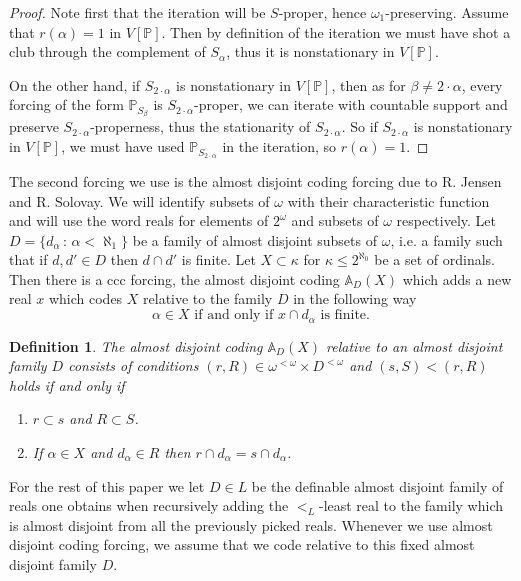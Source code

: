 \documentclass[a4paper,11pt]{article}
\newtheorem{definition}[theorem]{Definition}
\newcommand{\forceP}{\mathbb{P}}
\begin{document}
\begin{proof}
Note first that the iteration will be $S$-proper, hence $\omega_1$-preserving. Assume  that $r(\alpha)=1$ in $V[{\forceP}]$. Then by definition of the iteration
 we must have shot a club through the complement of $S_{\alpha}$, thus it is nonstationary
 in $V[{\forceP}]$. 
 
 On the other hand, if $S_{2 \cdot \alpha}$ is nonstationary in $V[{\forceP}]$, then
 as for $\beta \ne 2 \cdot \alpha$, every forcing of the form $\forceP_{S_{\beta}}$ is $S_{2 \cdot \alpha}$-proper,
 we can iterate with countable support and preserve $S_{2 \cdot \alpha}$-properness, thus the stationarity of $S_{2 \cdot \alpha}$.
 So if $S_{2 \cdot \alpha}$ is nonstationary in $V[{\forceP}]$, we must have used $\forceP_{S_{2 \cdot \alpha}}$ in the iteration,
 so $r(\alpha)= 1$.
 
\end{proof}
The second forcing we use is the almost disjoint coding forcing due to R. Jensen and R. Solovay. We will identify subsets of $\omega$ with their characteristic function and will use the word reals for elements of $2^{\omega}$ and subsets of $\omega$ respectively.
Let $D=\{d_{\alpha} \, : \, \alpha < \aleph_1 \}$ be a family of almost disjoint subsets of $\omega$, i.e. a family such that if $d, d' \in D$ then 
$d \cap d'$ is finite. Let $X\subset  \kappa$ for $\kappa \le 2^{\aleph_0}$ be a set of ordinals. Then there 
is a ccc forcing, the almost disjoint coding $\mathbb{A}_D(X)$ which adds 
a new real $x$ which codes $X$ relative to the family $D$ in the following way
$$\alpha \in X \text{ if and only if } x \cap d_{\alpha} \text{ is finite.}$$
\begin{definition}
 The almost disjoint coding $\mathbb{A}_D(X)$ relative to an almost disjoint family $D$ consists of
 conditions $(r, R) \in \omega^{<\omega} \times D^{<\omega}$ and
 $(s,S) < (r,R)$ holds if and only if
 \begin{enumerate}
  \item $r \subset s$ and $R \subset S$.
  \item If $\alpha \in X$ and $d_{\alpha} \in R$ then $r \cap d_{\alpha} = s \cap d_{\alpha}$.
 \end{enumerate}
\end{definition}
For the rest of this paper we let $D \in L$ be the definable almost disjoint family of reals one obtains when recursively adding the $<_L$-least real to the family which is almost disjoint from all the previously picked reals. 
Whenever we use almost disjoint coding forcing, we assume that we code relative to this fixed almost disjoint family $D$.
\end{document}
